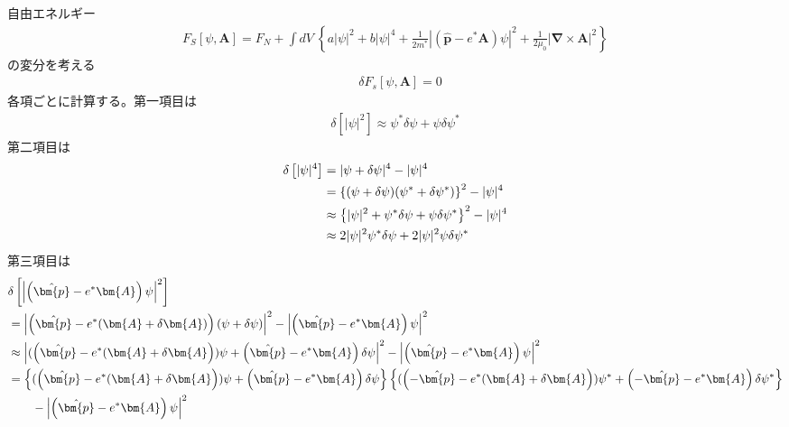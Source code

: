 \documentclass[dvipdfmx, 11pt, a4paper]{jsarticle}
\numberwithin{equation}{section}
\theoremstyle{definition}
\begin{document}
    \begin{derivationBox}
        自由エネルギー
        \begin{align}
            F_S[\psi,\bm{A}]     = F_N + \int dV\ \left\{ a|\psi|^2 + b|\psi|^4 +  \frac{1}{2m^*} \left| \left( \hat{\bm{p}} -e^*\bm{A} \right) \psi \right|^2 + \frac{1}{2\mu_0} |\bm{\nabla} \times \bm{A}|^2 \right\}
        \end{align}
        の変分を考える
        \begin{align}
            &\delta F_s[\psi,\bm{A}] = 0 
        \end{align}
        各項ごとに計算する。第一項目は
        \begin{align}
            \delta\left[ |\psi|^2 \right] \approx \psi^*\delta \psi  +  \psi \delta \psi^*
        \end{align}
        第二項目は
        \begin{align}
            \delta \left[ |\psi|^4 \right] &= |\psi +\delta \psi|^4 - |\psi|^4 \notag \\
            &= \left\{ (\psi + \delta\psi)(\psi^* + \delta\psi^*) \right\}^2 - |\psi|^4 \notag \\
            &\approx \left\{ |\psi|^2 + \psi^* \delta\psi + \psi \delta \psi^*  \right\}^2 - |\psi|^4 \notag \\
            &\approx  2|\psi|^2 \psi^* \delta\psi + 2|\psi|^2\psi \delta \psi^*
        \end{align}
        第三項目は
        \begin{align}
            &\delta \left[  \left|  \left( \hat{\bm{p}} -e^*\bm{A} \right) \psi \right|^2 \right] \notag \\
            &= \left|  \left( \hat{\bm{p}} -e^*(\bm{A} + \delta \bm{A}) \right) (\psi + \delta \psi) \right|^2 - \left|  \left( \hat{\bm{p}} -e^*\bm{A} \right) \psi \right|^2\notag \\
            &\approx \left| (\left( \hat{\bm{p}} -e^*(\bm{A} + \delta \bm{A} \right)) \psi + \left( \hat{\bm{p}} -e^*\bm{A}  \right)  \delta \psi  \right|^2 - \left|  \left( \hat{\bm{p}} -e^*\bm{A} \right) \psi \right|^2  \notag \\
            &= \left\{ (\left( \hat{\bm{p}} -e^*(\bm{A} + \delta \bm{A} \right)) \psi + \left( \hat{\bm{p}} -e^*\bm{A}  \right)  \delta \psi  \right\} \left\{ (\left( -\hat{\bm{p}} -e^*(\bm{A} + \delta \bm{A} \right)) \psi^* + \left( -\hat{\bm{p}} -e^*\bm{A}  \right)  \delta \psi^*  \right\} \notag \\
            &\ \ \ \ \ \ - \left|  \left( \hat{\bm{p}} -e^*\bm{A} \right) \psi \right|^2 \notag \\

\end{align}
\end{derivationBox}
\end{document}
